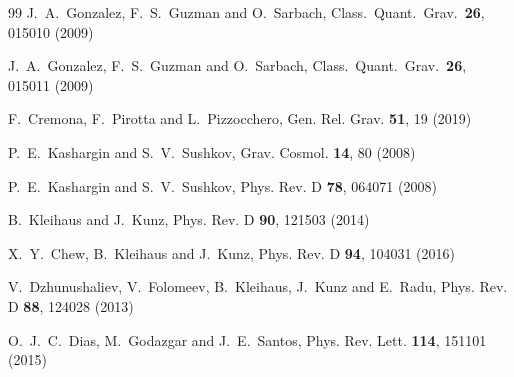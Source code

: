 \documentclass[twocolumn,showpacs,preprintnumbers,amsmath,amssymb,floatfix]{revtex4-1}
\begin{document}
\begin{thebibliography}{99}
  J.~A.~Gonzalez, F.~S.~Guzman and O.~Sarbach,
  Class.\ Quant.\ Grav.\  {\bf 26}, 015010 (2009)

  J.~A.~Gonzalez, F.~S.~Guzman and O.~Sarbach,
  Class.\ Quant.\ Grav.\  {\bf 26},  015011 (2009)

F.~Cremona, F.~Pirotta and L.~Pizzocchero,
Gen. Rel. Grav. \textbf{51}, 19 (2019)

P.~E.~Kashargin and S.~V.~Sushkov,
Grav. Cosmol. \textbf{14}, 80 (2008)

P.~E.~Kashargin and S.~V.~Sushkov,
Phys. Rev. D \textbf{78}, 064071 (2008)

B.~Kleihaus and J.~Kunz,
Phys. Rev. D \textbf{90}, 121503 (2014)

X.~Y.~Chew, B.~Kleihaus and J.~Kunz,
Phys. Rev. D \textbf{94}, 104031 (2016)

V.~Dzhunushaliev, V.~Folomeev, B.~Kleihaus, J.~Kunz and E.~Radu,
Phys. Rev. D \textbf{88}, 124028 (2013)

O.~J.~C.~Dias, M.~Godazgar and J.~E.~Santos,
Phys. Rev. Lett. \textbf{114}, 151101 (2015)


\end{thebibliography}
\end{document}
